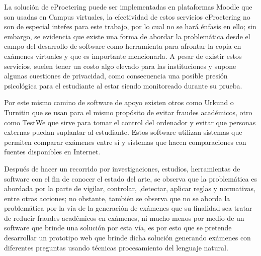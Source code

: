 \documentclass[../Main.tex]{subfiles}
\begin{document}
\begin{justify}
La solución de eProctering puede ser implementadas en plataformas Moodle que son usadas en Campus virtuales,  la efectividad de estos servicios eProctering no son de especial inteŕes para este trabajo, por lo cual no se hará énfasis en ello; sin embargo, se evidencia que existe una forma de abordar la problemática desde el campo del desarrollo de software como herramienta para afrontar la copia en exámenes virtuales y que es importante mencionarla. A pesar de existir estos servicios, suelen tener un costo algo elevado para las instituciones y supone algunas cuestiones de privacidad, como consecuencia una posible presión psicológica para el estudiante al estar siendo monitoreado durante su prueba.
\end{justify}\par

\begin{justify}
Por este mismo camino de software de apoyo existen otros como Urkund \cite{12} o Turnitin \cite{13} que se usan para el mismo propósito de evitar fraudes académicos, otro como TestWe \cite{14}que sirve para tomar el control del ordenador y evitar que personas externas puedan suplantar al estudiante. Estos software utilizan sistemas que permiten comparar exámenes entre sí y sistemas que hacen comparaciones con fuentes disponibles en Internet. 
\end{justify}\par

\begin{justify}
Después de hacer un recorrido por investigaciones, estudios, herramientas de software con el fin de conocer el estado del arte, se observa que la problemática es abordada por la parte de vigilar, controlar, ,detectar, aplicar reglas y normativas, entre otras acciones; no obstante, también se observa que no se aborda la problemática por la vía de la generación de exámenes que su finalidad sea tratar de reducir fraudes académicos en exámenes, ni mucho menos por medio de un software que brinde una solución por esta vía, es por esto que se pretende desarrollar un prototipo web que brinde dicha solución generando exámenes con diferentes preguntas usando técnicas procesamiento del lenguaje natural. 
\end{justify}\par
\end{document}
